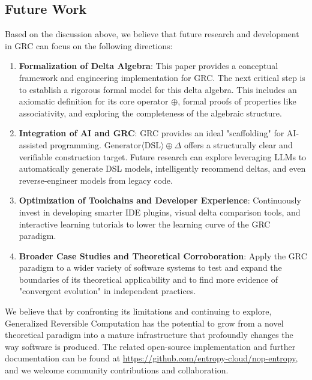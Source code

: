 \documentclass[11pt]{article}
\begin{document}
\subsection{Future Work}

Based on the discussion above, we believe that future research and development in GRC can focus on the following directions:

\begin{enumerate}
    \item \textbf{Formalization of Delta Algebra}: This paper provides a conceptual framework and engineering implementation for GRC. The next critical step is to establish a rigorous formal model for this delta algebra. This includes an axiomatic definition for its core operator $\oplus$, formal proofs of properties like associativity, and exploring the completeness of the algebraic structure.
    \item \textbf{Integration of AI and GRC}: GRC provides an ideal "scaffolding" for AI-assisted programming. $\text{Generator}\langle\text{DSL}\rangle \oplus \Delta$ offers a structurally clear and verifiable construction target. Future research can explore leveraging LLMs to automatically generate DSL models, intelligently recommend deltas, and even reverse-engineer models from legacy code.
    \item \textbf{Optimization of Toolchains and Developer Experience}: Continuously invest in developing smarter IDE plugins, visual delta comparison tools, and interactive learning tutorials to lower the learning curve of the GRC paradigm.
    \item \textbf{Broader Case Studies and Theoretical Corroboration}: Apply the GRC paradigm to a wider variety of software systems to test and expand the boundaries of its theoretical applicability and to find more evidence of "convergent evolution" in independent practices.
\end{enumerate}

We believe that by confronting its limitations and continuing to explore, Generalized Reversible Computation has the potential to grow from a novel theoretical paradigm into a mature infrastructure that profoundly changes the way software is produced. The related open-source implementation and further documentation can be found at \url{https://github.com/entropy-cloud/nop-entropy}, and we welcome community contributions and collaboration.
\end{document}
